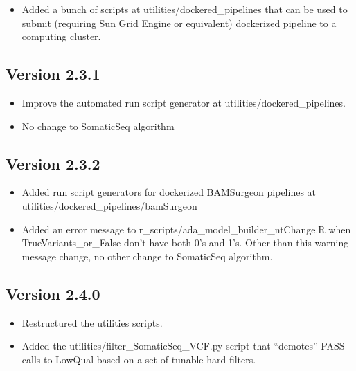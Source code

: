 \documentclass[10pt,letterpaper]{article}
\begin{document}
\begin{sloppypar}
\begin{itemize}
  \item
  Added a bunch of scripts at utilities/dockered\_pipelines that can be used to submit (requiring Sun Grid Engine or equivalent) dockerized pipeline to a computing cluster. 

\end{itemize}


\subsection{Version 2.3.1}

\begin{itemize}

  \item
  Improve the automated run script generator at utilities/dockered\_pipelines.
  
  \item
  No change to SomaticSeq algorithm

\end{itemize}



\subsection{Version 2.3.2}

\begin{itemize}

  \item
  Added run script generators for dockerized BAMSurgeon pipelines at utilities/dockered\_pipelines/bamSurgeon
  
  \item
  Added an error message to r\_scripts/ada\_model\_builder\_ntChange.R when TrueVariants\_or\_False don't have both 0's and 1's. Other than this warning message change, no other change to SomaticSeq algorithm.  

\end{itemize}


\subsection{Version 2.4.0}

\begin{itemize}

  \item
  Restructured the utilities scripts.
  
  \item
  Added the utilities/filter\_SomaticSeq\_VCF.py script that ``demotes'' PASS calls to LowQual based on a set of tunable hard filters.
  

\end{itemize}
\end{sloppypar}
\end{document}
